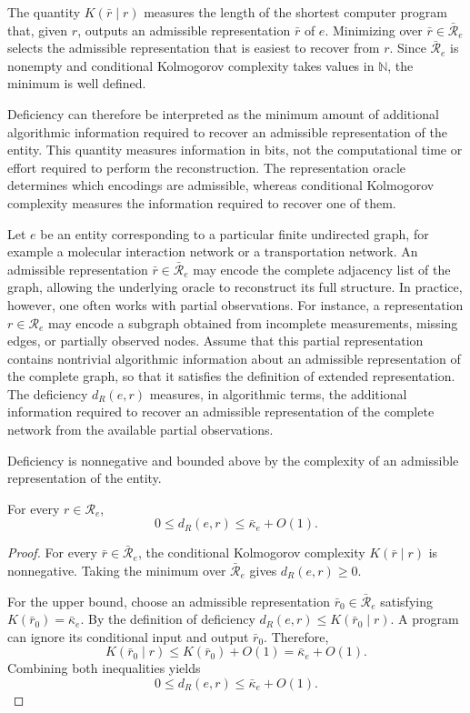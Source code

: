 The quantity $K(\bar r\mid r)$ measures the length of the shortest computer program that, given $r$, outputs an admissible representation $\bar r$ of $e$. Minimizing over $\bar r\in\bar{\mathcal R}_e$ selects the admissible representation that is easiest to recover from $r$. Since $\bar{\mathcal R}_e$ is nonempty and conditional Kolmogorov complexity takes values in $\mathbb N$, the minimum is well defined.

Deficiency can therefore be interpreted as the minimum amount of additional algorithmic information required to recover an admissible representation of the entity. This quantity measures information in bits, not the computational time or effort required to perform the reconstruction. The representation oracle determines which encodings are admissible, whereas conditional Kolmogorov complexity measures the information required to recover one of them.

\begin{example}
Let $e$ be an entity corresponding to a particular finite undirected graph, for example a molecular interaction network or a transportation network. An admissible representation $\bar r\in\bar{\mathcal R}_e$ may encode the complete adjacency list of the graph, allowing the underlying oracle to reconstruct its full structure. In practice, however, one often works with partial observations. For instance, a representation $r\in\mathcal R_e$ may encode a subgraph obtained from incomplete measurements, missing edges, or partially observed nodes. Assume that this partial representation contains nontrivial algorithmic information about an admissible representation of the complete graph, so that it satisfies the definition of extended representation. The deficiency $d_R(e,r)$ measures, in algorithmic terms, the additional information required to recover an admissible representation of the complete network from the available partial observations.
\end{example}

Deficiency is nonnegative and bounded above by the complexity of an admissible representation of the entity.

\begin{proposition}
\label{prop:deficiency_bounds}
For every $r\in\mathcal R_e$,
\[
0 \le d_R(e,r) \le \bar\kappa_e+O(1).
\]
\end{proposition}
\begin{proof}
For every $\bar r\in\bar{\mathcal R}_e$, the conditional Kolmogorov complexity $K(\bar r\mid r)$ is nonnegative. Taking the minimum over $\bar{\mathcal R}_e$ gives $d_R(e,r)\ge 0$.

For the upper bound, choose an admissible representation $\bar r_0\in\bar{\mathcal R}_e$ satisfying $K(\bar r_0)=\bar\kappa_e$. By the definition of deficiency $d_R(e,r)\le K(\bar r_0\mid r)$. A program can ignore its conditional input and output $\bar r_0$. Therefore,
\[
K(\bar r_0\mid r) \le K(\bar r_0)+O(1) =\bar\kappa_e+O(1).
\]
Combining both inequalities yields
\[
0\le d_R(e,r) \le \bar\kappa_e+O(1).
\]
\end{proof}

